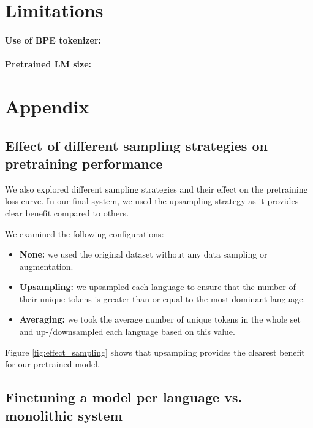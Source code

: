 \documentclass[11pt]{article}
\begin{document}
\section*{Limitations}

\paragraph{Use of BPE tokenizer:}

\paragraph{Pretrained LM size:}




\appendix

\section{Appendix}
\label{sec:appendix}

\subsection{Effect of different sampling strategies on pretraining performance}

We also explored different sampling strategies and their effect on the pretraining loss curve.
In our final system, we used the upsampling strategy as it provides clear benefit compared to others.

We examined the following configurations:
\begin{itemize}
  \item \textbf{None:} we used the original dataset without any data sampling or augmentation.
  \item \textbf{Upsampling:} we upsampled each language to ensure that the number of their unique tokens is greater than or equal to the most dominant language.
  \item \textbf{Averaging:} we took the average number of unique tokens in the whole set and up-/downsampled each language based on this value.
\end{itemize}

Figure \ref{fig:effect_sampling} shows that upsampling provides the clearest benefit for our pretrained model.

\subsection{Finetuning a model per language vs. monolithic system}
\end{document}
